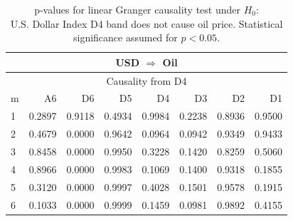 %
%
\begin{table}[H]
\begin{center}
\begin{tabular}{l|r r r r r r r}
\hline\hline
\multicolumn{8}{c}{USD $\Rightarrow$ Oil}\\
\hline
\multicolumn{8}{c}{Causality from D4}\\
\hline\hline
m & A6 & D6 & D5 & D4 & D3 & D2 & D1 \\
\hline
1 & 0.2897 & 0.9118 & 0.4934 & 0.9984 & 0.2238 & 0.8936 & 0.9500 \\
2 & 0.4679 & \cellcolor{mygrey}0.0000 & 0.9642 & 0.0964 & 0.0942 & 0.9349 & 0.9433 \\
3 & 0.8458 & \cellcolor{mygrey}0.0000 & 0.9950 & 0.3228 & 0.1420 & 0.8259 & 0.5060 \\
4 & 0.8966 & \cellcolor{mygrey}0.0000 & 0.9983 & 0.1069 & 0.1400 & 0.9318 & 0.1855 \\
5 & 0.3120 & \cellcolor{mygrey}0.0000 & 0.9997 & 0.4028 & 0.1501 & 0.9578 & 0.1915 \\
6 & 0.1033 & \cellcolor{mygrey}0.0000 & 0.9999 & 0.1459 & 0.0981 & 0.9892 & 0.4155 \\
\hline\hline
\end{tabular}
\caption{p-values for linear Granger causality test under $H_0$:\\
U.S. Dollar Index D4 band does not cause oil price. Statistical significance assumed for $p<0.05$.}
\end{center}
\end{table}

